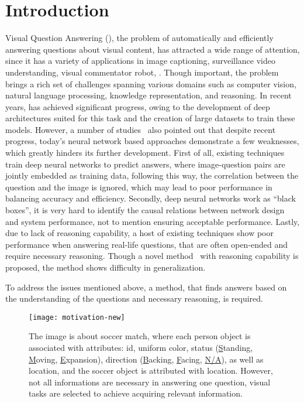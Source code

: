 \section{Introduction}
\label{sec-intro}


Visual Question Answering (\vqa), the
problem of automatically and efficiently answering questions about visual content, has attracted a wide range of attention, since it has a variety of applications in \eg image captioning, surveillance video understanding, visual commentator robot, \etc. 
Though important, the \vqa problem brings a rich set of challenges spanning various domains such as computer vision, natural language processing, knowledge representation, and reasoning. 
In recent years, \vqa has achieved significant
progress, owing to the development of deep architectures suited for this task and the creation of large \vqa datasets to train these models. 
However, a number of studies~\cite{peixi2019,Goyal_2017} also pointed out that despite recent progress, today's neural network based approaches demonstrate a few weaknesses, which greatly hinders its further development. First of all, existing techniques train deep neural networks to predict answers, where image-question pairs are jointly embedded as training data, following this way, the correlation between the question and the image is ignored, which may lead to poor performance in balancing accuracy and efficiency. Secondly, deep neural networks work as ``black boxes'', it is very hard to identify the causal relations between network design and system performance, not to mention ensuring acceptable performance. Lastly, due to lack of reasoning capability, a host of existing techniques show poor performance when answering real-life questions, that are often open-ended and require necessary reasoning. Though a novel method~\cite{peixi2019} with reasoning capability is proposed, the method shows difficulty in generalization.  

To address the issues mentioned above, a method, that finds answers based on the understanding of the questions and necessary reasoning, is required. 


\begin{figure}[tb]
\hspace{-3.91ex}
\texttt{[image: motivation-new]}
\caption{The image is about soccer match, where each person object is associated with attributes: id, uniform color, status (\underline{S}tanding, \underline{M}oving, \underline{E}xpansion), direction (\underline{B}acking, \underline{F}acing, \underline{N/A}), as well as location, and the soccer object is attributed with location. However, not all informations are necessary in answering one question, visual tasks are selected to achieve acquiring relevant information.%
}
\vspace{-4ex}
\label{fig:example}
\end{figure}

